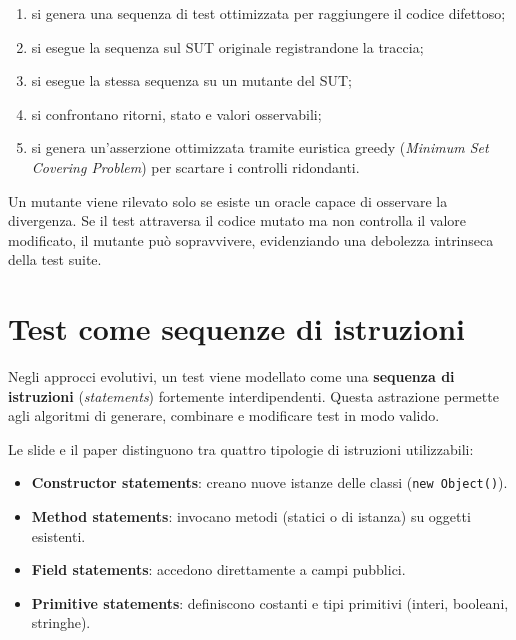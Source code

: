 \begin{enumerate}

\item si genera una sequenza di test ottimizzata per raggiungere il codice difettoso;

\item si esegue la sequenza sul SUT originale registrandone la traccia;

\item si esegue la stessa sequenza su un mutante del SUT;

\item si confrontano ritorni, stato e valori osservabili;

\item si genera un'asserzione ottimizzata tramite euristica greedy (\emph{Minimum Set Covering Problem}) per scartare i controlli ridondanti.

\end{enumerate}

\begin{notaprof}

Un mutante viene rilevato solo se esiste un oracle capace di osservare la divergenza. Se il test attraversa il codice mutato ma non controlla il valore modificato, il mutante può sopravvivere, evidenziando una debolezza intrinseca della test suite.

\end{notaprof}

\section{Test come sequenze di istruzioni}

Negli approcci evolutivi, un test viene modellato come una \textbf{sequenza di istruzioni} (\emph{statements}) fortemente interdipendenti. Questa astrazione permette agli algoritmi di generare, combinare e modificare test in modo valido.

\begin{notaslide}

Le slide e il paper distinguono tra quattro tipologie di istruzioni utilizzabili:

\begin{itemize}

\item \textbf{Constructor statements}: creano nuove istanze delle classi (\texttt{new Object()}).

\item \textbf{Method statements}: invocano metodi (statici o di istanza) su oggetti esistenti.

\item \textbf{Field statements}: accedono direttamente a campi pubblici.

\item \textbf{Primitive statements}: definiscono costanti e tipi primitivi (interi, booleani, stringhe).

\end{itemize}

\end{notaslide}

